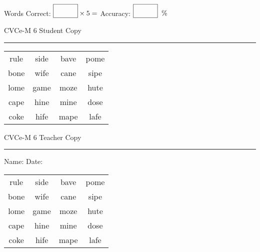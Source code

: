 \documentclass{memoir}
\begin{document}
\small

Words Correct: $\fbox{\phantom{\huge 100}} \times 5 = $ Accuracy: $\fbox{\phantom{\huge 100}}\;\; \%$ 

\vfill

\newpage


\footnotesize \noindent
CVCe-M 6 \hfill Student Copy
\smallskip
\hrule

\Large

\setlength{\tabcolsep}{14pt}
\def\arraystretch{2}

{\selectfont


\begin{vplace}[0.5]
\begin{center}
\begin{tabular}{cccc}
rule & side & bave & pome \\
bone & wife & cane & sipe \\
lome & game & moze & hute \\
cape & hine & mine & dose \\
coke & hife & mape & lafe \\
\end{tabular}
\end{center}
\end{vplace}

}

\newpage

\footnotesize \noindent
CVCe-M 6 \hfill Teacher Copy
\smallskip
\hrule

\small

\vfill

\noindent
Name: \underline{\hspace{1.75in}} \hfill Date: \underline{\hspace{1in}}

\Large

{\selectfont


\begin{vplace}[0.5]
\begin{center}
\begin{tabular}{cccc}
rule & side & bave & pome \\
bone & wife & cane & sipe \\
lome & game & moze & hute \\
cape & hine & mine & dose \\
coke & hife & mape & lafe \\
\end{tabular}
\end{center}
\end{vplace}



}
\end{document}
